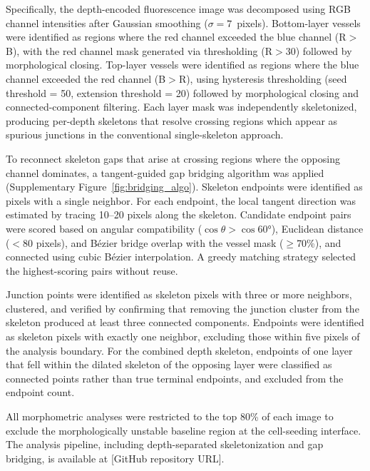 Specifically, the depth-encoded fluorescence image was decomposed using RGB channel intensities after Gaussian smoothing ($\sigma = 7$~pixels). Bottom-layer vessels were identified as regions where the red channel exceeded the blue channel (R$>$B), with the red channel mask generated via thresholding (R$>$30) followed by morphological closing. Top-layer vessels were identified as regions where the blue channel exceeded the red channel (B$>$R), using hysteresis thresholding (seed threshold = 50, extension threshold = 20) followed by morphological closing and connected-component filtering. Each layer mask was independently skeletonized, producing per-depth skeletons that resolve crossing regions which appear as spurious junctions in the conventional single-skeleton approach.

To reconnect skeleton gaps that arise at crossing regions where the opposing channel dominates, a tangent-guided gap bridging algorithm was applied (Supplementary Figure~\ref{fig:bridging_algo}). Skeleton endpoints were identified as pixels with a single neighbor. For each endpoint, the local tangent direction was estimated by tracing 10--20 pixels along the skeleton. Candidate endpoint pairs were scored based on angular compatibility ($\cos\theta > \cos 60°$), Euclidean distance ($<$80 pixels), and B\'{e}zier bridge overlap with the vessel mask ($\geq$70\%), and connected using cubic B\'{e}zier interpolation. A greedy matching strategy selected the highest-scoring pairs without reuse.

Junction points were identified as skeleton pixels with three or more neighbors, clustered, and verified by confirming that removing the junction cluster from the skeleton produced at least three connected components. Endpoints were identified as skeleton pixels with exactly one neighbor, excluding those within five pixels of the analysis boundary. For the combined depth skeleton, endpoints of one layer that fell within the dilated skeleton of the opposing layer were classified as connected points rather than true terminal endpoints, and excluded from the endpoint count.

All morphometric analyses were restricted to the top 80\% of each image to exclude the morphologically unstable baseline region at the cell-seeding interface. The analysis pipeline, including depth-separated skeletonization and gap bridging, is available at [GitHub repository URL].
